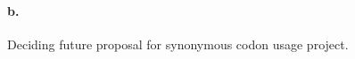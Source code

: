\documentclass[11pt, a4paper]{article}
\begin{document}
\paragraph{b.} Deciding future proposal for synonymous codon usage project.



\small


\end{document}
